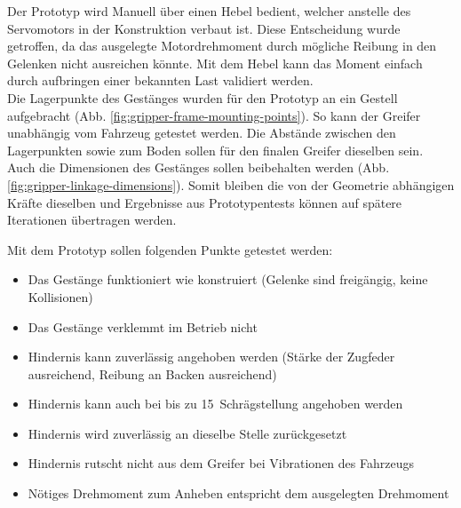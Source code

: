 Der Prototyp wird Manuell über einen Hebel bedient, welcher anstelle des Servomotors in der Konstruktion verbaut ist. Diese Entscheidung wurde getroffen, da das ausgelegte Motordrehmoment durch mögliche Reibung in den Gelenken nicht ausreichen könnte. Mit dem Hebel kann das Moment einfach durch aufbringen einer bekannten Last validiert werden.
\\
Die Lagerpunkte des Gestänges wurden für den Prototyp an ein Gestell aufgebracht (Abb. \ref{fig:gripper-frame-mounting-points}). So kann der Greifer unabhängig vom Fahrzeug getestet werden. Die Abstände zwischen den Lagerpunkten sowie zum Boden sollen für den finalen Greifer dieselben sein. Auch die Dimensionen des Gestänges sollen beibehalten werden (Abb. \ref{fig:gripper-linkage-dimensions}). Somit bleiben die von der Geometrie abhängigen Kräfte dieselben und Ergebnisse aus Prototypentests können auf spätere Iterationen übertragen werden.

Mit dem Prototyp sollen folgenden Punkte getestet werden:
\begin{itemize}
    \item Das Gestänge funktioniert wie konstruiert (Gelenke sind freigängig, keine Kollisionen)
    \item Das Gestänge verklemmt im Betrieb nicht 
    \item Hindernis kann zuverlässig angehoben werden (Stärke der Zugfeder ausreichend, Reibung an Backen ausreichend)
    \item Hindernis kann auch bei bis zu 15\textdegree\ Schrägstellung angehoben werden
    \item Hindernis wird zuverlässig an dieselbe Stelle zurückgesetzt
    \item Hindernis rutscht nicht aus dem Greifer bei Vibrationen des Fahrzeugs
    \item  Nötiges Drehmoment zum Anheben entspricht dem ausgelegten Drehmoment
\end{itemize}





